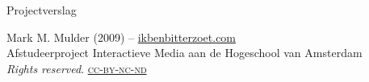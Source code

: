 \thispagestyle{empty}

\begin{flushleft}

  \Huge
  Projectverslag\\

  \vfill{}

  \small
  Mark M. Mulder (2009) -- \href{http://www.ikbenbitterzoet.com/}{ikbenbitterzoet.com}\\
  Afstudeerproject Interactieve Media aan de Hogeschool van Amsterdam
  \\\emph{Rights reserved}.  \href{http://creativecommons.org/licenses/by-nc-nd/3.0/nl/}{\textsc{cc-by-nc-nd}}

\end{flushleft}
\pagebreak
\normalsize